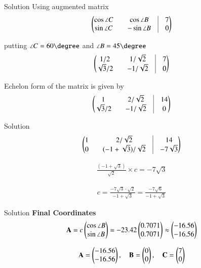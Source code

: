\documentclass{beamer}
\begin{document}
\begin{frame}{Solution}
Using augmented matrix
\begin{align}
    \myvec{\cos \angle C && \cos \angle B &\vrule &7 \\
    \sin \angle C && -\sin \angle B &\vrule &0}
\end{align}

putting $\angle C = 60 \degree$ and $\angle B = 45 \degree$
\begin{align}
    \myvec{1/2 && 1/\sqrt{2} &\vrule &7 \\
    \sqrt{3}/2 && -1/\sqrt{2} &\vrule &0}
\end{align}

Echelon form of the matrix is given by
\begin{align}
    \myvec{1 && 2/\sqrt{2} &\vrule &14 \\
    \sqrt{3}/2 && -1/\sqrt{2} &\vrule &0}
\end{align}
\end{frame}

\begin{frame}{Solution}
\begin{align}
    \myvec{1 && 2/\sqrt{2} &\vrule &14 \\
    0 && (-1 + \sqrt{3})/\sqrt{2} &\vrule &-7\sqrt{3}}
\end{align}

\begin{align}
    \frac{(- 1 + \sqrt{3})}{\sqrt{2}} \times c = - 7 \sqrt{3}
\end{align}

\begin{align}
    c = \frac{-7\sqrt{3} \cdot \sqrt{2}}{-1 + \sqrt{3}} = \frac{-7\sqrt{6}}{-1 + \sqrt{3}}
\end{align}
\end{frame}

\begin{frame}{Solution}
\textbf{Final Coordinates}
\begin{align}
\mathbf{A} = c \begin{pmatrix}\cos \angle B \\ \sin \angle B\end{pmatrix} = -23.42 \begin{pmatrix}0.7071 \\ 0.7071\end{pmatrix} \approx \begin{pmatrix}-16.56 \\ -16.56\end{pmatrix}
\end{align}

\begin{align}
\mathbf{A} = \begin{pmatrix}-16.56 \\ -16.56\end{pmatrix}, \quad
\mathbf{B} = \begin{pmatrix}0 \\ 0\end{pmatrix}, \quad
\mathbf{C} = \begin{pmatrix}7 \\ 0\end{pmatrix}
\end{align}
\end{frame}
\end{document}
